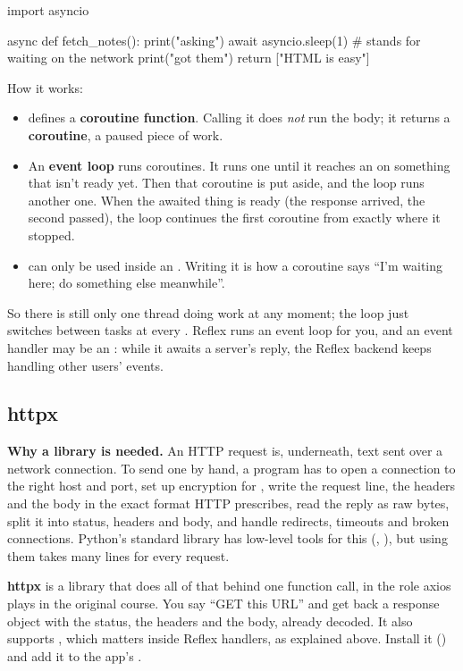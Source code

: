 \begin{py}
import asyncio


async def fetch_notes():
	print("asking")
	await asyncio.sleep(1)      # stands for waiting on the network
	print("got them")
	return ["HTML is easy"]
\end{py}

How it works:

\begin{itemize}
\item {} defines a \textbf{coroutine function}. Calling it does \emph{not} run the body; it returns a \textbf{coroutine}, a paused piece of work.
\item An \textbf{event loop} runs coroutines. It runs one until it reaches an  on something that isn't ready yet. Then that coroutine is put aside, and the loop runs another one. When the awaited thing is ready (the response arrived, the second passed), the loop continues the first coroutine from exactly where it stopped.
\item {} can only be used inside an . Writing it is how a coroutine says ``I'm waiting here; do something else meanwhile''.
\end{itemize}

So there is still only one thread doing work at any moment; the loop just switches between tasks at every . Reflex runs an event loop for you, and an event handler may be an : while it awaits a server's reply, the Reflex backend keeps handling other users' events.

\subsection{httpx}

\textbf{Why a library is needed.} An HTTP request is, underneath, text sent over a network connection. To send one by hand, a program has to open a connection to the right host and port, set up encryption for , write the request line, the headers and the body in the exact format HTTP prescribes, read the reply as raw bytes, split it into status, headers and body, and handle redirects, timeouts and broken connections. Python's standard library has low-level tools for this (, ), but using them takes many lines for every request.

\textbf{httpx} is a library that does all of that behind one function call, in the role axios plays in the original course. You say ``GET this URL'' and get back a response object with the status, the headers and the body, already decoded. It also supports , which matters inside Reflex handlers, as explained above. Install it () and add it to the app's .

